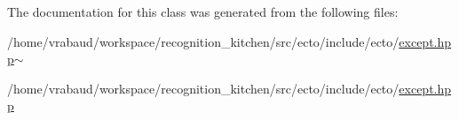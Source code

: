 The documentation for this class was generated from the following files\-:\begin{DoxyCompactItemize}
\item 
/home/vrabaud/workspace/recognition\-\_\-kitchen/src/ecto/include/ecto/\hyperlink{except_8hpp~}{except.\-hpp$\sim$}\item 
/home/vrabaud/workspace/recognition\-\_\-kitchen/src/ecto/include/ecto/\hyperlink{except_8hpp}{except.\-hpp}\end{DoxyCompactItemize}
